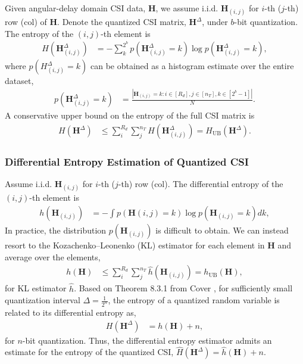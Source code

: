 Given angular-delay domain CSI data, $\mathbf H$, we assume i.i.d. $\mathbf H_{(i,j)}$ for $i$-th ($j$-th) row (col) of $\mathbf H$.
Denote the quantized CSI matrix, $\mathbf H^\Delta$, under $b$-bit quantization. The entropy of the $(i,j)$-th element is
\begin{align*}
H(\mathbf H^\Delta_{(i,j)}) &= - \sum_{k}^{2^b} p(\mathbf H^\Delta_{(i,j)} = k) \log p(\mathbf H^\Delta_{(i,j)} = k),
\end{align*}
where $p(H^\Delta_{(i,j)} = k)$ can be obtained as a histogram estimate over the entire dataset,
\begin{align*}
	p(\mathbf H^\Delta_{(i,j)} = k) &= \frac{|\mathbf H_{(i,j)}=k:i\in[R_d],j\in[n_T],k\in[2^b-1]|}{N}.
\end{align*}
A conservative upper bound on the entropy of the full CSI matrix is
\begin{align}
H(\mathbf H^\Delta) &\leq \sum_{i}^{R_d}\sum_{j}^{n_T} H(\mathbf H^\Delta_{(i,j)}) = H_{\text{UB}}(\mathbf H^\Delta). \label{eq:csi-ent}
\end{align}

\subsubsection{Differential Entropy Estimation of Quantized CSI} \label{sec:diffent_est_quant}

Assume i.i.d. $\mathbf H_{(i,j)}$ for $i$-th ($j$-th) row (col). The differential entropy of the $(i,j)$-th element is
\begin{align*}
	h(\mathbf H_{(i,j)}) &= - \int p(\mathbf H{(i,j)} = k) \log p(\mathbf H_{(i,j)} = k) dk,
\end{align*}
In practice, the distribution $p(\mathbf H_{(i,j)})$ is difficult to obtain. We can instead resort to the Kozachenko–Leonenko (KL) estimator \cite{ref:Kozachenko1987SampleEstimate} for each element in $\mathbf H$ and average over the elements,
\begin{align}
	h(\mathbf H) &\leq \sum_{i}^{R_d}\sum_{j}^{n_T} \hat h(\mathbf H_{(i,j)}) = h_{\text{UB}}(\mathbf H), \label{eq:csi-diff-ent}
\end{align}
for KL estimator $\hat h$. Based on Theorem 8.3.1 from Cover \cite{ref:Cover1999Elements}, for sufficiently small quantization interval $\Delta = \frac {1}{2^n}$, the entropy of a quantized random variable is related to its differential entropy as,
\begin{align}
  H(\mathbf H^{\Delta}) &= h(\mathbf H) + n, \label{eq:cover-thm}
\end{align}
for $n$-bit quantization. Thus, the differential entropy estimator admits an estimate for the entropy of the quantized CSI, $\hat H({\mathbf H}^\Delta) = \hat h(\mathbf H) + n$.

